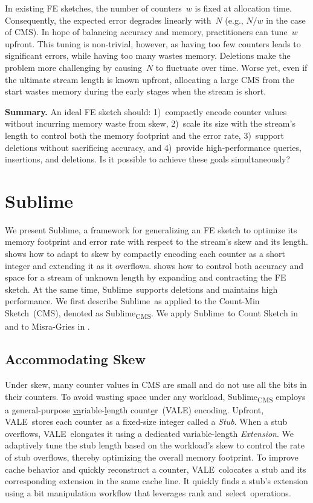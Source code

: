 \documentclass[sigconf]{acmart}
\newcommand{\sketch}{Sublime}
\newcommand{\sketchcms}{\sketch\textsubscript{CMS}\xspace}
\newcommand{\counterencoding}{\underline{va}riable-\underline{l}ength count\underline{e}r}
\newcommand{\counterencodingabbrv}{VALE}
\begin{document}
In existing FE sketches, the number of counters~$w$ is fixed at allocation time.
Consequently, the expected error degrades linearly with~$N$ (e.g., $N/w$ in the case of CMS).
In hope of balancing accuracy and memory, practitioners can tune~$w$ upfront.
This tuning is non-trivial, however, as having too few counters leads to significant errors, while having too many wastes memory.
Deletions make the problem more challenging by causing~$N$ to fluctuate over time.
Worse yet, even if the ultimate stream length is known upfront, allocating a large CMS from the start wastes memory during the early stages when the stream is short. 

\textbf{Summary.}
An ideal FE sketch should: 1)~compactly encode counter values without incurring
memory waste from skew, 2)~scale its size with the stream's length to control
both the memory footprint and the error rate,
3)~support deletions without sacrificing accuracy, and 4)~provide
  high-performance queries, insertions, and deletions. Is it possible to
  achieve these goals simultaneously?

\section{\sketch}\label{sec:sublime} 
We present \sketch, a framework for generalizing an FE sketch to optimize its
memory footprint and error rate with respect to the stream's skew and its
length. 
shows how to adapt to skew by compactly encoding each counter as a short
integer and extending it as it overflows.
shows how to control both accuracy and space for a stream of unknown length by
expanding and contracting the FE sketch. At the same time, \sketch\ supports
deletions and maintains high performance. We first describe \sketch\ as applied
to the Count-Min Sketch~(CMS), denoted as \sketchcms. 
We apply \sketch\ to Count Sketch in 
and to
Misra-Gries in .

\subsection{Accommodating Skew}\label{sec:accommodating_skew}
Under skew, many counter values in CMS are small and do not use all the bits in
their counters. To avoid wasting space under any workload, \sketchcms employs a
general-purpose \counterencoding~(\counterencodingabbrv) encoding. Upfront,
\counterencodingabbrv\ stores each counter as a fixed-size integer called a
\emph{Stub}. When a stub overflows, \counterencodingabbrv\ elongates it using a
dedicated variable-length \emph{Extension}. We adaptively tune the stub length
based on the workload's skew to control the rate of stub overflows, thereby
optimizing the overall memory footprint. To improve cache behavior and quickly
reconstruct a counter, \counterencodingabbrv\ colocates a stub and its
corresponding extension in the same cache line. It quickly finds a stub's
extension using a bit manipulation workflow that leverages rank
and~select~operations.
\end{document}
